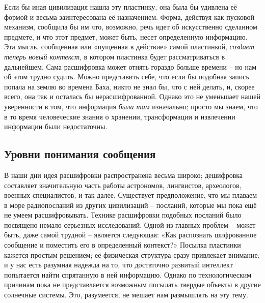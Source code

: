 \documentclass[../main.tex]{subfiles}
\begin{document}
Если бы иная цивилизация нашла эту пластинку, она была бы удивлена её формой и весьма заинтересована её назначением. Форма, действуя как пусковой механизм, сообщила бы им что, возможно, речь идет об искусственно сделанном предмете, и что этот предмет, может быть, несет определенную информацию. Эта мысль, сообщенная или «пущенная в действие» самой пластинкой, \emph{создает теперь новый контекст}, в котором пластинка будет рассматриваться в дальнейшем. Сама расшифровка может отнять гораздо больше времени \--- но нам об этом трудно судить. Можно представить себе, что если бы подобная запись попала на землю во времена Баха, никто не знал бы, что с ней делать, и, скорее всего, она так и осталась бы нерасшифрованной. Однако это не уменьшает нашей уверенности в том, что информация \emph{была там} изначально; просто мы знаем, что в то время человеческие знания о хранении, трансформации и извлечении информации были недостаточны.


\subsection{Уровни понимания сообщения}

В наши дни идея расшифровки распространена весьма широко; дешифровка составляет значительную часть работы астрономов, лингвистов, археологов, военных специалистов, и так далее. Существует предположение, что мы плаваем в море радиопосланий из других цивилизаций \--- посланий, которые мы пока ещё не умеем расшифровывать. Технике расшифровки подобных посланий было посвящено немало серьезных исследований. Одной из главных проблем \--- может быть, даже самой трудной \--- является следующая: «Как распознать шифрованное сообщение и поместить его в определенный контекст?» Посылка пластинки кажется простым решением; её физическая структура сразу привлекает внимание, и у нас есть разумная надежда на то, что достаточно развитый интеллект попытается найти спрятанную в ней информацию. Однако по технологическим причинам пока не представляется возможным посылать твердые объекты в другие солнечные системы. Это, разумеется, не мешает нам размышлять на эту тему.
\end{document}
